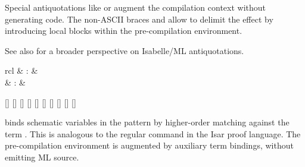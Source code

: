 \begin{isabellebody}
\begin{isamarkuptext}
  Special antiquotations like  or  augment the compilation context without generating code.  The
  non-ASCII braces  and  allow to delimit the
  effect by introducing local blocks within the pre-compilation
  environment.

  \medskip See also \cite{Wenzel-Chaieb:2007b} for a broader
  perspective on Isabelle/ML antiquotations.%
\end{isamarkuptext}%
\isamarkuptrue%
%
\isadelimmlantiq
%
\endisadelimmlantiq
%
\isatagmlantiq
%
\begin{isamarkuptext}%
\begin{matharray}{rcl}
  \hypertarget{ML antiquotation.let}{\hyperlink{ML antiquotation.let}{\mbox{}}} & : &  \\
  \hypertarget{ML antiquotation.note}{\hyperlink{ML antiquotation.note}{\mbox{}}} & : &  \\
  \end{matharray}

  \begin{railoutput}
[]
\rail@plus
\rail@plus
{}[]
[]
\rail@endplus
{}[]
[]
[]
\rail@endplus
\rail@end
{}
[]
\rail@plus
\rail@bar
{}
[]
\rail@endbar
{}[]
[]
\rail@endplus
\rail@end
\end{railoutput}


  \begin{description}

  \item {} binds schematic variables in the
  pattern  by higher-order matching against the term .  This is analogous to the regular \hyperlink{command.let}{\mbox{}} command
  in the Isar proof language.  The pre-compilation environment is
  augmented by auxiliary term bindings, without emitting ML source.


\end{description}
\end{isamarkuptext}
\end{isabellebody}

